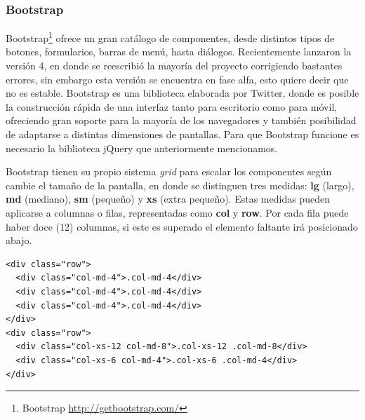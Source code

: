 \subsubsection{Bootstrap}

Bootstrap\footnote{Bootstrap \url{http://getbootstrap.com/}} ofrece un gran catálogo de componentes, desde distintos tipos de botones, formularios, barras de menú, hasta diálogos. Recientemente lanzaron la versión 4, en donde se reescribió la mayoría del proyecto corrigiendo bastantes errores, sin embargo esta versión se encuentra en fase alfa, esto quiere decir que no es estable. Bootstrap es una biblioteca elaborada por Twitter, donde es posible la construcción rápida de una interfaz tanto para escritorio como para móvil, ofreciendo gran soporte para la mayoría de los navegadores y también posibilidad de adaptarse a distintas dimensiones de pantallas. Para que Bootstrap funcione es necesario la biblioteca jQuery que anteriormente mencionamos.

Bootstrap tienen su propio sistema \textit{grid} para escalar los componentes según cambie el tamaño de la pantalla, en donde se distinguen tres medidas: \textbf{lg} (largo), \textbf{md} (mediano), \textbf{sm} (pequeño) y \textbf{xs} (extra pequeño). Estas medidas pueden aplicarse a columnas o filas, representadas como \textbf{col} y \textbf{row}. Por cada fila puede haber doce (12) columnas, si este es superado el elemento faltante irá posicionado abajo.
\begin{verbatim}
<div class="row">
  <div class="col-md-4">.col-md-4</div>
  <div class="col-md-4">.col-md-4</div>
  <div class="col-md-4">.col-md-4</div>
</div>
<div class="row">
  <div class="col-xs-12 col-md-8">.col-xs-12 .col-md-8</div>
  <div class="col-xs-6 col-md-4">.col-xs-6 .col-md-4</div>
</div>
\end{verbatim}

